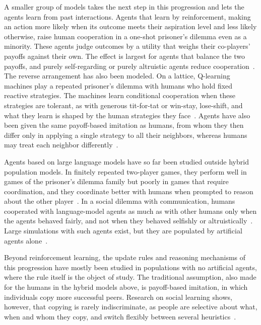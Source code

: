 A smaller group of models takes the next step in this progression and lets the agents learn from past interactions. Agents that learn by reinforcement, making an action more likely when its outcome meets their aspiration level and less likely otherwise, raise human cooperation in a one-shot prisoner's dilemma even as a minority. These agents judge outcomes by a utility that weighs their co-players' payoffs against their own. The effect is largest for agents that balance the two payoffs, and purely self-regarding or purely altruistic agents reduce cooperation~\cite{guoEngineeringOptimalCooperation2024}. The reverse arrangement has also been modeled. On a lattice, Q-learning machines play a repeated prisoner's dilemma with humans who hold fixed reactive strategies. The machines learn conditional cooperation when these strategies are tolerant, as with generous tit-for-tat or win-stay, lose-shift, and what they learn is shaped by the human strategies they face~\cite{quanHumanMachineCooperation2026}. Agents have also been given the same payoff-based imitation as humans, from whom they then differ only in applying a single strategy to all their neighbors, whereas humans may treat each neighbor differently~\cite{jiaAsymmetricInteractionPreference2025}.

Agents based on large language models have so far been studied outside hybrid population models. In finitely repeated two-player games, they perform well in games of the prisoner's dilemma family but poorly in games that require coordination, and they coordinate better with humans when prompted to reason about the other player~\cite{akataPlayingRepeatedGames2025}. In a social dilemma with communication, humans cooperated with language-model agents as much as with other humans only when the agents behaved fairly, and not when they behaved selfishly or altruistically~\cite{wangLLMAgentsOvercome2026}. Large simulations with such agents exist, but they are populated by artificial agents alone~\cite{Piao2025, zihengWhyAreWe2025}.


Beyond reinforcement learning, the update rules and reasoning mechanisms of this progression have mostly been studied in populations with no artificial agents, where the rule itself is the object of study. The traditional assumption, also made for the humans in the hybrid models above, is payoff-based imitation, in which individuals copy more successful peers. Research on social learning shows, however, that copying is rarely indiscriminate, as people are selective about what, when and whom they copy, and switch flexibly between several heuristics~\cite{kendalSocialLearningStrategies2018}.

